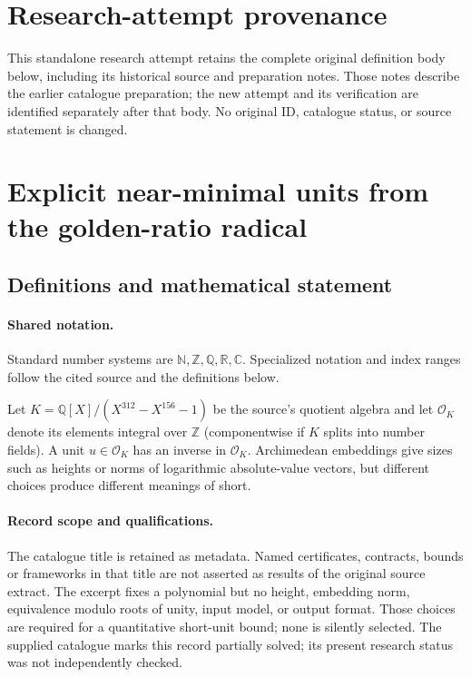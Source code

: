 \documentclass[11pt]{article}
\begin{document}
\section*{Research-attempt provenance}
This standalone research attempt retains the complete original definition body below,
including its historical source and preparation notes. Those notes describe the
earlier catalogue preparation; the new attempt and its verification are identified
separately after that body. No original ID, catalogue status, or source statement is changed.

\section{Explicit near-minimal units from the golden-ratio radical}\label{statement}

\subsection{Definitions and mathematical statement}

\paragraph{Shared notation.}Standard number systems are $\mathbb N,\mathbb Z,\mathbb Q,\mathbb R,\mathbb C$. Specialized notation and index ranges follow the cited source and the definitions below.


Let $K=\mathbb Q[X]/(X^{312}-X^{156}-1)$ be the source's quotient algebra and let $\mathcal O_K$ denote its elements integral over $\mathbb Z$ (componentwise if $K$ splits into number fields). A unit $u\in\mathcal O_K$ has an inverse in $\mathcal O_K$. Archimedean embeddings give sizes such as heights or norms of logarithmic absolute-value vectors, but different choices produce different meanings of short.
\paragraph{Record scope and qualifications.}
The catalogue title is retained as metadata. Named certificates, contracts, bounds or frameworks in that title are not asserted as results of the original source extract.
The excerpt fixes a polynomial but no height, embedding norm, equivalence modulo roots of unity, input model, or output format. Those choices are required for a quantitative short-unit bound; none is silently selected. The supplied catalogue marks this record partially solved; its present research status was not independently checked.
\end{document}
